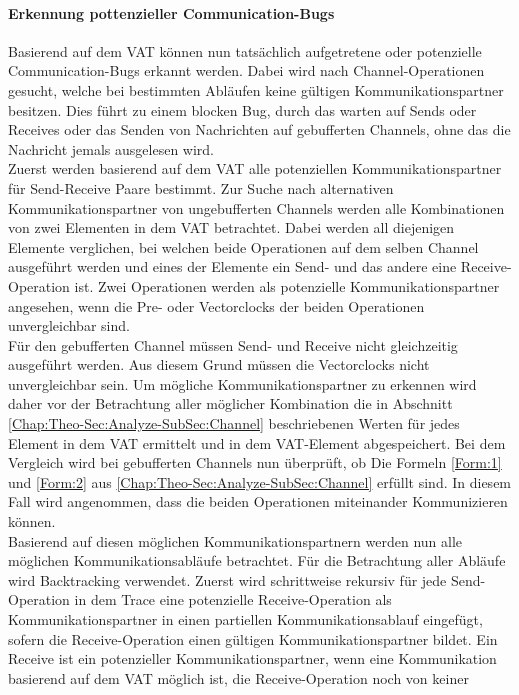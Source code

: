 \paragraph{Erkennung pottenzieller Communication-Bugs}
Basierend auf dem VAT können nun tatsächlich aufgetretene oder potenzielle 
Communication-Bugs erkannt werden. Dabei wird nach Channel-Operationen 
gesucht, welche bei bestimmten Abläufen keine gültigen Kommunikationspartner
besitzen. Dies führt zu einem blocken Bug, durch das warten auf 
Sends oder Receives oder das Senden von Nachrichten auf gebufferten 
Channels, ohne das die Nachricht jemals ausgelesen wird.\\  
Zuerst werden basierend auf dem VAT alle potenziellen Kommunikationspartner 
für Send-Receive Paare bestimmt.
Zur Suche nach alternativen Kommunikationspartner von ungebufferten Channels
werden alle Kombinationen
von zwei Elementen in dem VAT betrachtet. Dabei werden all diejenigen 
Elemente verglichen, bei welchen beide Operationen auf dem selben Channel 
ausgeführt werden und eines der 
Elemente ein Send- und das andere eine Receive-Operation ist. Zwei Operationen
werden als potenzielle Kommunikationspartner angesehen, wenn die Pre- oder
Vectorclocks der beiden 
Operationen unvergleichbar sind.\\
Für den gebufferten Channel müssen Send- und Receive nicht 
gleichzeitig ausgeführt werden. Aus diesem Grund müssen die Vectorclocks 
nicht unvergleichbar sein. Um mögliche Kommunikationspartner zu erkennen 
wird daher vor der Betrachtung aller möglicher Kombination
die in Abschnitt \ref{Chap:Theo-Sec:Analyze-SubSec:Channel} beschriebenen 
Werten für jedes Element in dem VAT ermittelt und in dem VAT-Element abgespeichert.
Bei dem Vergleich wird bei gebufferten Channels nun überprüft, 
ob Die Formeln \eqref{Form:1} und \eqref{Form:2} aus \ref{Chap:Theo-Sec:Analyze-SubSec:Channel}
erfüllt sind. In diesem Fall wird angenommen, dass die beiden Operationen
miteinander Kommunizieren können.\\
Basierend auf diesen möglichen Kommunikationspartnern werden nun alle möglichen
Kommunikationsabläufe betrachtet. Für die Betrachtung aller Abläufe 
wird Backtracking verwendet. Zuerst wird schrittweise rekursiv für jede Send-Operation 
in dem Trace eine potenzielle Receive-Operation als Kommunikationspartner 
in einen partiellen Kommunikationsablauf eingefügt, sofern die 
Receive-Operation einen gültigen Kommunikationspartner bildet. Ein Receive 
ist ein potenzieller Kommunikationspartner, wenn eine Kommunikation 
basierend auf dem VAT möglich ist, die Receive-Operation noch von keiner 
